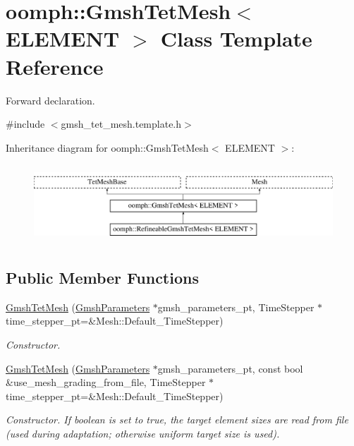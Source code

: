 \hypertarget{classoomph_1_1GmshTetMesh}{}\section{oomph\+:\+:Gmsh\+Tet\+Mesh$<$ E\+L\+E\+M\+E\+NT $>$ Class Template Reference}
\label{classoomph_1_1GmshTetMesh}


Forward declaration.  




{\ttfamily \#include $<$gmsh\+\_\+tet\+\_\+mesh.\+template.\+h$>$}

Inheritance diagram for oomph\+:\+:Gmsh\+Tet\+Mesh$<$ E\+L\+E\+M\+E\+NT $>$\+:\begin{figure}[H]
\begin{center}
\leavevmode
\includegraphics[height=2.957747cm]{classoomph_1_1GmshTetMesh}
\end{center}
\end{figure}
\subsection*{Public Member Functions}
\begin{DoxyCompactItemize}
\item 
\hyperlink{classoomph_1_1GmshTetMesh_a3f9c7d2c2a617f4b497778ff44109dbc}{Gmsh\+Tet\+Mesh} (\hyperlink{classoomph_1_1GmshParameters}{Gmsh\+Parameters} $\ast$gmsh\+\_\+parameters\+\_\+pt, Time\+Stepper $\ast$time\+\_\+stepper\+\_\+pt=\&Mesh\+::\+Default\+\_\+\+Time\+Stepper)
\begin{DoxyCompactList}\small\item\em Constructor. \end{DoxyCompactList}\item 
\hyperlink{classoomph_1_1GmshTetMesh_a8b93f46d9a6a442f6d5e9b8e86f33882}{Gmsh\+Tet\+Mesh} (\hyperlink{classoomph_1_1GmshParameters}{Gmsh\+Parameters} $\ast$gmsh\+\_\+parameters\+\_\+pt, const bool \&use\+\_\+mesh\+\_\+grading\+\_\+from\+\_\+file, Time\+Stepper $\ast$time\+\_\+stepper\+\_\+pt=\&Mesh\+::\+Default\+\_\+\+Time\+Stepper)
\begin{DoxyCompactList}\small\item\em Constructor. If boolean is set to true, the target element sizes are read from file (used during adaptation; otherwise uniform target size is used). \end{DoxyCompactList}\end{DoxyCompactItemize}
